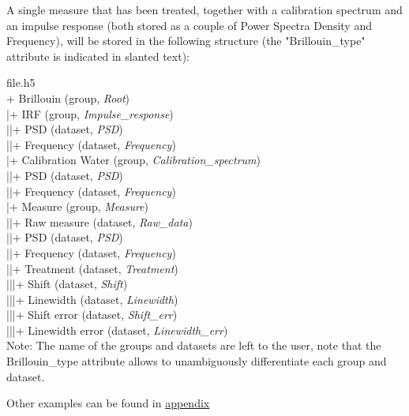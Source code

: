 A single measure that has been treated, together with a calibration spectrum and an impulse response (both stored as a couple of Power Spectra Density and Frequency), will be stored in the following structure (the "Brillouin\_type" attribute is indicated in slanted text):

\noindent file.h5\\
+ Brillouin (group, \textit{Root})\\
|\indent + IRF (group, \textit{Impulse\_response})\\
|\indent |\indent + PSD (dataset, \textit{PSD})\\
|\indent |\indent + Frequency (dataset, \textit{Frequency})\\
|\indent + Calibration Water (group, \textit{Calibration\_spectrum})\\
|\indent |\indent + PSD (dataset, \textit{PSD})\\
|\indent |\indent + Frequency (dataset, \textit{Frequency})\\
|\indent + Measure (group, \textit{Measure})\\
|\indent |\indent + Raw measure (dataset, \textit{Raw\_data})\\
|\indent |\indent + PSD (dataset, \textit{PSD})\\
|\indent |\indent + Frequency (dataset, \textit{Frequency})\\
|\indent |\indent + Treatment (dataset, \textit{Treatment})\\
|\indent |\indent |\indent + Shift (dataset, \textit{Shift})\\
|\indent |\indent |\indent + Linewidth (dataset, \textit{Linewidth})\\
|\indent |\indent |\indent + Shift error (dataset, \textit{Shift\_err})\\
|\indent |\indent |\indent + Linewidth error (dataset, \textit{Linewidth\_err})\\


Note: The name of the groups and datasets are left to the user, note that the Brillouin\_type attribute allows to unambiguously differentiate each group and dataset.

Other examples can be found in \hyperref[chap:examples_file_structures]{appendix}
